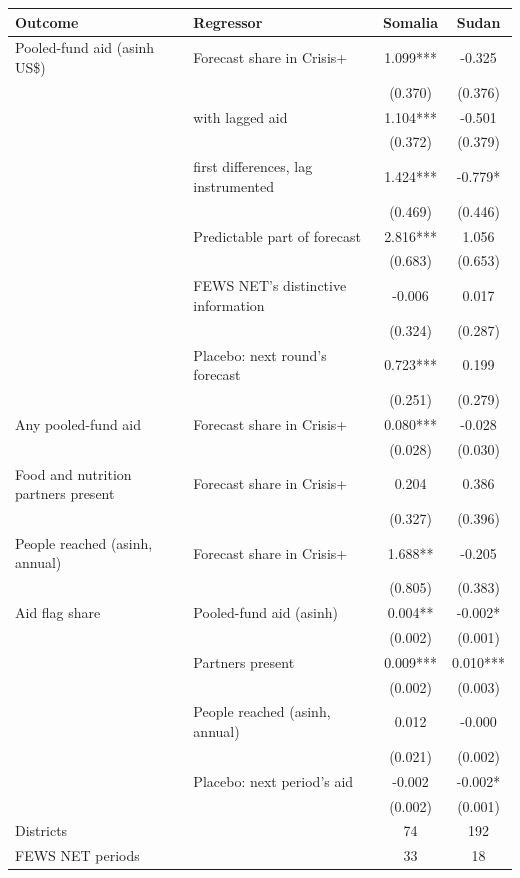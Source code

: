 \begin{tabular}{llcc}
\toprule
Outcome & Regressor & Somalia & Sudan \\
\midrule
Pooled-fund aid (asinh US\$) & Forecast share in Crisis+ & 1.099*** & -0.325 \\
 & & (0.370) & (0.376) \\
 & \quad with lagged aid & 1.104*** & -0.501 \\
 & & (0.372) & (0.379) \\
 & \quad first differences, lag instrumented & 1.424*** & -0.779* \\
 & & (0.469) & (0.446) \\
 & Predictable part of forecast & 2.816*** & 1.056 \\
 & & (0.683) & (0.653) \\
 & FEWS NET's distinctive information & -0.006 & 0.017 \\
 & & (0.324) & (0.287) \\
 & Placebo: next round's forecast & 0.723*** & 0.199 \\
 & & (0.251) & (0.279) \\
Any pooled-fund aid & Forecast share in Crisis+ & 0.080*** & -0.028 \\
 & & (0.028) & (0.030) \\
Food and nutrition partners present & Forecast share in Crisis+ & 0.204 & 0.386 \\
 & & (0.327) & (0.396) \\
People reached (asinh, annual) & Forecast share in Crisis+ & 1.688** & -0.205 \\
 & & (0.805) & (0.383) \\
Aid flag share & Pooled-fund aid (asinh) & 0.004** & -0.002* \\
 & & (0.002) & (0.001) \\
 & Partners present & 0.009*** & 0.010*** \\
 & & (0.002) & (0.003) \\
 & People reached (asinh, annual) & 0.012 & -0.000 \\
 & & (0.021) & (0.002) \\
 & Placebo: next period's aid & -0.002 & -0.002* \\
 & & (0.002) & (0.001) \\
\midrule
Districts & & 74 & 192 \\
FEWS NET periods & & 33 & 18 \\
\bottomrule
\end{tabular}
